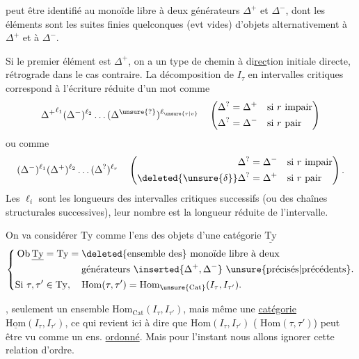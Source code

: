 
peut être identifié au monoïde libre  à deux générateurs $\Delta^+$ et $\Delta^-$, dont les éléments  sont les suites finies quelconques (evt vides) d'objets alternativement  à $\Delta^+$ et à $\Delta^-$. 

Si le premier élément est $\Delta^+$, on a un  type de chemin à di\uline{rec}tion initiale directe, rétrograde dans le cas contraire. La décomposition de $I_\tau$  en intervalles critiques correspond à l'écriture réduite d'un mot comme
\[ {\Delta^+}^{\ell_1}(\Delta^-)^{\ell_2}\ldots(\Delta^{\unsure{?}})^{\ell_{\unsure{r|v}}}
\quad\left(\begin{aligned}\Delta^{?}&=\Delta^+&&\text{si }r\text{ impair}\\\Delta^{?}&=\Delta^-&&\text{si }r\text{ pair}\end{aligned}\right) \]
ou comme
\[ (\Delta^-)^{\ell_1}(\Delta^+)^{\ell_2}\ldots(\Delta^{?})^{\ell_r}
\quad\left(\begin{aligned}\Delta^{?}&=\Delta^-&&\text{si }r\text{ impair}\\
\deleted{\unsure{\delta}}\Delta^{?}&=\Delta^+&&\text{si }r\text{ pair}\end{aligned}\right). \]
Les $\ell_i$ sont les longueurs des intervalles critiques successifs (ou des chaînes structurales successives), leur nombre est la longueur réduite de l'intervalle.

On va considérer $\mathrm{Ty}$ comme l'ens des objets d'une catégorie $\underline{\mathrm{Ty}}$
\[ \left\{\begin{aligned}
\mathrm{Ob}\,\underline{\mathrm{Ty}}&=\mathrm{Ty}=\begin{aligned}[t]
&\text{\deleted{ensemble des} monoïde libre à deux}\\
&\text{générateurs }\inserted{\Delta^+,\Delta^-}\ \text{\unsure{précisés|précédents}.}
\end{aligned}\\
\text{Si }\tau,\tau'&\in\mathrm{Ty},\quad \mathrm{Hom}(\tau,\tau')=\mathrm{Hom}_{\unsure{\mathrm{Cat}}}(I_\tau,I_{\tau'}).
\end{aligned}\right. \]

,  seulement un ensemble $\mathrm{Hom}_{\mathrm{Cat}}(I_\tau,I_{\tau'})$, mais même une \uline{catégorie} $\underline{\mathrm{Hom}}(I_\tau,I_{\tau'})$, ce qui revient ici à dire que $\mathrm{Hom}(I_\tau,I_{\tau'})$ ( $\mathrm{Hom}(\tau,\tau')$) peut être vu comme un ens. \uline{ordonné}. Mais pour l'instant nous allons ignorer cette relation d'ordre.
